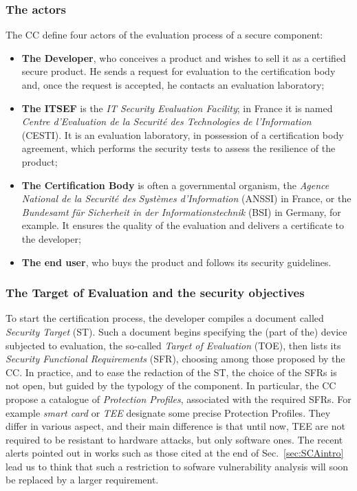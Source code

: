 \subsubsection{The actors} The CC define four actors of the evaluation process of a secure component:
\begin{itemize}
\item \textbf{The Developer}, who conceives a product and wishes to sell it as a certified secure product. He sends a request for evaluation to the certification body and, once the request is accepted, he contacts an evaluation laboratory;
\item \textbf{The ITSEF} is the \emph{IT Security Evaluation Facility}; in France it is named \emph{Centre d'Evaluation de la Securit\'e des Technologies de l'Information} (CESTI). It is an evaluation laboratory, in possession of a certification body agreement, which performs the security tests to assess the resilience of the product;
\item \textbf{The Certification Body} is often a governmental organism, the \emph{Agence National de la Securit\'e des Syst\`emes d'Information} (ANSSI) in France, or the \emph{Bundesamt f\"ur Sicherheit in der Informationstechnik} (BSI) in Germany, for example. It ensures the quality of the evaluation and delivers a certificate to the developer;
\item \textbf{The end user}, who buys the product and follows its security guidelines.
\end{itemize} 

\subsubsection{The Target of Evaluation and the security objectives} 
To start the certification process, the developer compiles a document called \emph{Security Target} (ST). Such a document begins specifying the (part of the) device subjected to evaluation, the so-called \emph{Target of Evaluation} (TOE), then lists its \emph{Security Functional Requirements} (SFR), choosing among those proposed by the CC. In practice, and to ease the redaction of the ST, the choice of the SFRs is not open, but guided by the typology of the component. In particular, the CC propose a catalogue of \emph{Protection Profiles}, associated with the required SFRs. For example \emph{smart card} or \emph{TEE} designate some precise Protection Profiles. They differ in various aspect, and their main difference is that until now, TEE are not required to be resistant to hardware attacks, but only software ones. The recent alerts pointed out in works such as those cited at the end of Sec.~\ref{sec:SCAintro} lead us to think that such a restriction to sofware vulnerability analysis will soon be replaced by a larger requirement.

